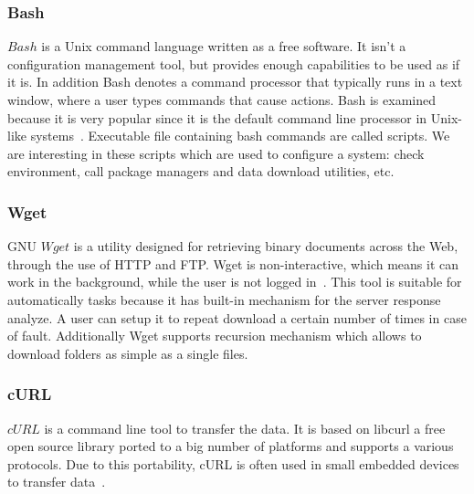 \subsubsection*{Bash} \label{lang:bash}
$Bash$ is a Unix command language written as a free software.
It isn't a configuration management tool, but provides enough capabilities to be used as if it is.
In addition Bash denotes a command processor that typically runs in a text window, where a user types commands that cause actions.
Bash is examined because it is very popular since it is the default command line processor in Unix-like systems~\cite*{bashdef}.
Executable file containing bash commands are called scripts.
We are interesting in these scripts which are used to configure a system: check environment, call package managers and data download utilities, etc.

\subsubsection*{Wget}
GNU $Wget$ is a utility designed for retrieving binary documents across the Web, through the use of HTTP and FTP.
Wget is non-interactive, which means it can work in the background, while the user is not logged in~\cite{wget_desc}.
This tool is suitable for automatically  tasks because it has built-in mechanism for the server response analyze.
A user can setup it to repeat download a certain number of times in case of fault.
Additionally Wget supports recursion mechanism which allows to download folders as simple as a single files.
\subsubsection*{cURL}
$cURL$ is a command line tool to transfer the data.
 It is based on libcurl a free open source library ported to a big number of platforms and supports a various protocols.
Due to this portability, cURL is often used in small embedded devices to transfer data~\cite{curl}.